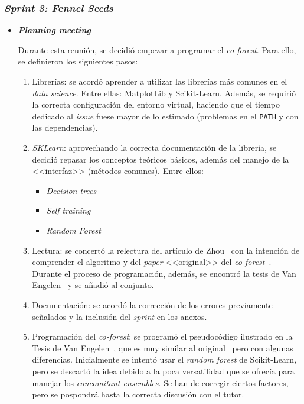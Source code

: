 \subsubsection{\textit{Sprint 3: Fennel Seeds}}
\begin{itemize}
	\item \textbf{\textit{Planning meeting}}
	
	Durante esta reunión, se decidió empezar a programar el \textit{co-forest}. Para ello, se definieron los siguientes pasos:
	
	\begin{enumerate}
		
		\item Librerías: se acordó aprender a utilizar las librerías más comunes en el \textit{data science}. Entre ellas: MatplotLib y Scikit-Learn. Además, se requirió la correcta configuración del entorno virtual, haciendo que el tiempo dedicado al \textit{issue} fuese mayor de lo estimado (problemas en el \texttt{PATH} y con las dependencias).
		
		\item \textit{SKLearn}: aprovechando la correcta documentación de la librería, se decidió repasar los conceptos teóricos básicos, además del manejo de la <<interfaz>> (métodos comunes). Entre ellos:
		
		\begin{itemize}
			\item \textit{Decision trees}
			\item \textit{Self training}
			\item \textit{Random Forest}
		\end{itemize}
	
		\item Lectura: se concertó la relectura del artículo de Zhou~\cite{zhou2021SemisupervisedRecommendationAttack} con la intención de comprender el algoritmo y del \textit{paper} <<original>> del \textit{co-forest}~\cite{originalCoForest2007}. Durante el proceso de programación, además, se encontró la tesis de Van Engelen~\cite{engelen2018thesis} y se añadió al conjunto.
		\item Documentación: se acordó la corrección de los errores previamente señalados y la inclusión del \textit{sprint} en los anexos.
		\item Programación del \textit{co-forest}: se programó el pseudocódigo ilustrado en la Tesis de Van Engelen~\cite{engelen2018thesis}, que es muy similar al original~\cite{originalCoForest2007} pero con algunas diferencias. Inicialmente se intentó usar el \textit{random forest} de Scikit-Learn, pero se descartó la idea debido a la poca versatilidad que se ofrecía para manejar los \textit{concomitant ensembles}. Se han de corregir ciertos factores, pero se pospondrá hasta la correcta discusión con el tutor.
		

\end{enumerate}
\end{itemize}
